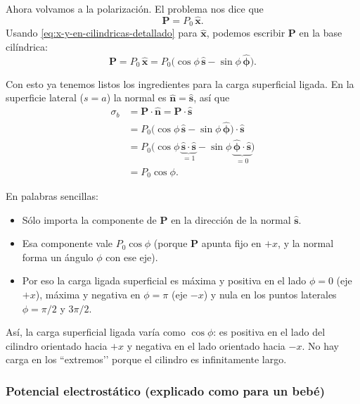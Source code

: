 \documentclass{article}
\begin{document}
Ahora volvamos a la polarización. El problema nos dice que
\[
\mathbf{P} = P_{0}\,\hat{\mathbf{x}}.
\]
Usando \eqref{eq:x-y-en-cilindricas-detallado} para $\hat{\mathbf{x}}$,
podemos escribir $\mathbf{P}$ en la base cilíndrica:
\begin{equation}
\mathbf{P}
= P_{0}\,\hat{\mathbf{x}}
= P_{0}\bigl(\cos\phi\,\hat{\mathbf{s}} - \sin\phi\,\hat{\boldsymbol{\phi}}\bigr).
\label{eq:P-en-cilindricas-detallado}
\end{equation}

Con esto ya tenemos listos los ingredientes para la carga superficial ligada.
En la superficie lateral ($s=a$) la normal es $\hat{\mathbf{n}}=\hat{\mathbf{s}}$, así que
\begin{align}
\sigma_{b}
&= \mathbf{P}\cdot\hat{\mathbf{n}}
= \mathbf{P}\cdot\hat{\mathbf{s}}
\label{eq:sigma-paso1}\\[4pt]
&= P_{0}\bigl(\cos\phi\,\hat{\mathbf{s}} - \sin\phi\,\hat{\boldsymbol{\phi}}\bigr)\cdot\hat{\mathbf{s}}
\label{eq:sigma-paso2}\\[4pt]
&= P_{0}\bigl(\cos\phi\,\underbrace{\hat{\mathbf{s}}\cdot\hat{\mathbf{s}}}_{=1}
               - \sin\phi\,\underbrace{\hat{\boldsymbol{\phi}}\cdot\hat{\mathbf{s}}}_{=0}\bigr)
\label{eq:sigma-paso3}\\[4pt]
&= P_{0}\cos\phi.
\label{eq:sigma-b-3-final-detallado}
\end{align}

En palabras sencillas:
\begin{itemize}
  \item Sólo importa la componente de $\mathbf{P}$ en la dirección de la normal
  $\hat{\mathbf{s}}$.
  \item Esa componente vale $P_{0}\cos\phi$ (porque $\mathbf{P}$ apunta fijo en $+x$,
  y la normal forma un ángulo $\phi$ con ese eje).
  \item Por eso la carga ligada superficial es máxima y positiva en el lado
  $\phi=0$ (eje $+x$), máxima y negativa en $\phi=\pi$ (eje $-x$) y nula en
  los puntos laterales $\phi=\pi/2$ y $3\pi/2$.
\end{itemize}


Así, la carga superficial ligada varía como $\cos\phi$: es positiva en el lado 
del cilindro orientado hacia $+x$ y negativa en el lado orientado hacia $-x$. 
No hay carga en los “extremos’’ porque el cilindro es infinitamente largo.

\subsubsection*{Potencial electrostático (explicado como para un bebé)}
\end{document}
